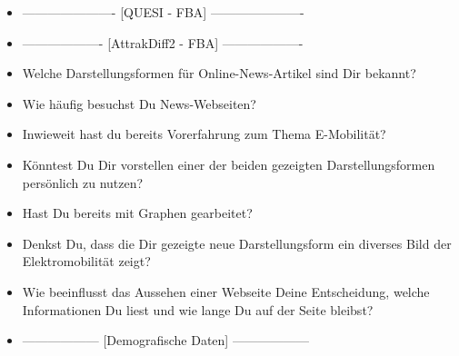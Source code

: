 {\begin{itemize}[]
    \item {----------------------} [QUESI - FBA] {----------------------}
    \item {-------------------} [AttrakDiff2 - FBA] {-------------------}
    \item {} Welche Darstellungsformen für Online-News-Artikel sind Dir bekannt?
    \item {} Wie häufig besuchst Du News-Webseiten?
    \item {} Inwieweit hast du bereits Vorerfahrung zum Thema E-Mobilität?
    \item {} Könntest Du Dir vorstellen einer der beiden gezeigten Darstellungsformen persönlich zu nutzen?
    \item {} Hast Du bereits mit Graphen gearbeitet?
    \item {} Denkst Du, dass die Dir gezeigte neue Darstellungsform ein diverses Bild der Elektromobilität zeigt?
    \item {} Wie beeinflusst das Aussehen einer Webseite Deine Entscheidung, welche Informationen Du liest und wie lange Du auf der Seite bleibst?
    \item {------------------} [Demografische Daten] {------------------}
\end{itemize}}
\nolinenumbers

